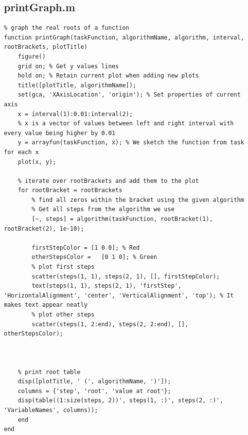 \subsection{printGraph.m}
\begin{simplechar}
\begin{lstlisting}
% graph the real roots of a function
function printGraph(taskFunction, algorithmName, algorithm, interval, rootBrackets, plotTitle)
    figure()
    grid on; % Get y values lines
    hold on; % Retain current plot when adding new plots
    title([plotTitle, algorithmName]);
    set(gca, 'XAxisLocation', 'origin'); % Set properties of current axis
    x = interval(1):0.01:interval(2);
    % x is a vector of values between left and right interval with every value being higher by 0.01
    y = arrayfun(taskFunction, x); % We sketch the function from task for each x
    plot(x, y);

    % iterate over rootBrackets and add them to the plot
    for rootBracket = rootBrackets
        % find all zeros within the bracket using the given algorithm
        % Get all steps from the algorithm we use
        [~, steps] = algorithm(taskFunction, rootBracket(1), rootBracket(2), 1e-10);

        firstStepColor = [1 0 0]; % Red
        otherStepsColor = 	[0 1 0]; % Green
        % plot first steps
        scatter(steps(1, 1), steps(2, 1), [], firstStepColor);
        text(steps(1, 1), steps(2, 1), 'firstStep', 'HorizontalAlignment', 'center', 'VerticalAlignment', 'top'); % It makes text appear neatly
        % plot other steps
        scatter(steps(1, 2:end), steps(2, 2:end), [], otherStepsColor);



    % print root table
    disp([plotTitle, ' (', algorithmName, ')']);
    columns = {'step', 'root', 'value at root'};
    disp(table((1:size(steps, 2))', steps(1, :)', steps(2, :)', 'VariableNames', columns));
    end
end

\end{lstlisting}
\end{simplechar}

\newpage
